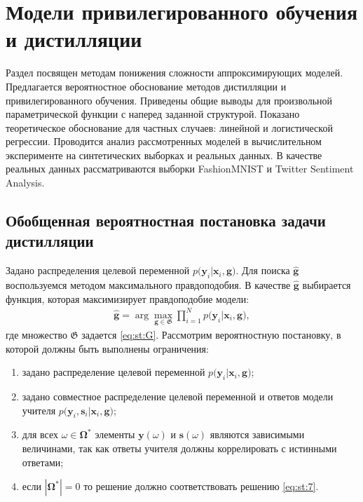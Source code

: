 \chapter{Модели привилегированного обучения и дистилляции}

Раздел посвящен методам понижения сложности аппроксимирующих моделей. Предлагается вероятностное обоснование методов дистилляции и привилегированного обучения. Приведены общие выводы для произвольной параметрической функции с наперед заданной структурой. Показано теоретическое обоснование для частных случаев: линейной и логистической регрессии. Проводится анализ рассмотренных моделей в вычислительном эксперименте на синтетических выборках и реальных данных. В качестве реальных данных рассматриваются выборки FashionMNIST и Twitter Sentiment Analysis.

\section{Обобщенная вероятностная постановка задачи дистилляции}

Задано распределения целевой переменной $p\bigr(\mathbf{y}_i|\mathbf{x}_i, \mathbf{g}\bigr)$.
Для поиска $\hat{\mathbf{g}}$ воспользуемся методом максимального правдоподобия. В качестве $\hat{\mathbf{g}}$ выбирается функция, которая максимизирует правдоподобие модели:
\[
\label{eq:st:7}
\begin{aligned}
\hat{\mathbf{g}} = \arg\max_{\mathbf{g}\in \mathfrak{G}} \prod_{i=1}^{N}p\bigr(\mathbf{y}_{i}|\mathbf{x}_i, \mathbf{g}\bigr),
\end{aligned}
\]
где множество $\mathfrak{G}$ задается \eqref{eq:st:G}.
Рассмотрим вероятностную постановку, в которой должны быть выполнены ограничения:
\begin{enumerate}
	\item задано распределение целевой переменной $p\bigr(\mathbf{y}_i|\mathbf{x}_i, \mathbf{g}\bigr)$;
	\item задано совместное распределение целевой переменной и ответов модели учителя $p\bigr(\mathbf{y}_i, \mathbf{s}_i|\mathbf{x}_i, \mathbf{g}\bigr)$;
	\item для всех $\omega \in \bm{\Omega}^*$ элементы $\mathbf{y}(\omega)$ и $\mathbf{s}(\omega)$ являются зависимыми величинами, так как ответы учителя должны коррелировать с истинными ответами;
	\item если $|\bm{\Omega}^*|=0$ то решение должно соответствовать решению \eqref{eq:st:7}.
\end{enumerate}

